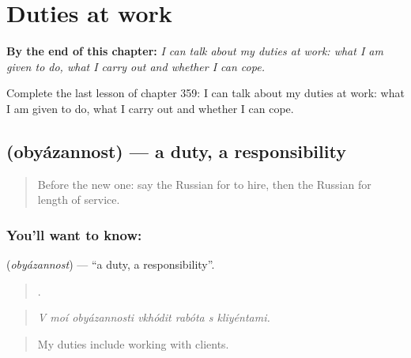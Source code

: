 
\chapter{Duties at work}
\label{ch:ru-duties-at-work}

\begin{chapteropening}
\textbf{By the end of this chapter:} \emph{I can talk about my duties at work: what I am given to do, what I carry out and whether I can cope.}

Complete the last lesson of chapter 359: I can talk about my duties at work: what I am given to do, what I carry out and whether I can cope.
\end{chapteropening}

\section[\texorpdfstring{\ru{обязанность} (obyázannost)}{обязанность (obyázannost)}]{ (obyázannost) — a duty, a responsibility}

\label{lesson:RU-C359-obyazannost}



\begin{quote}
Before the new one: say the Russian for to hire, then the Russian for length of service.
\end{quote}

\subsection*{You'll want to know: }
\textbf{} (\emph{obyázannost}) — \textquotedblleft{}a duty, a responsibility\textquotedblright{}.

\begin{quote}
      .
\end{quote}

\begin{quote}
\emph{V moí obyázannosti vkhódit rabóta s kliyéntami.}
\end{quote}

\begin{quote}
My duties include working with clients.
\end{quote}

